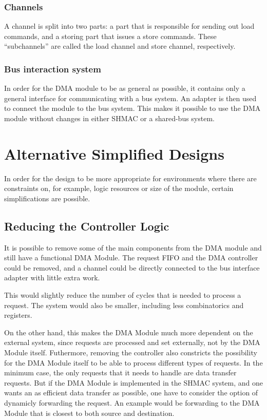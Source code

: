 \subsubsection{Channels}
A channel is split into two parts: a part that is responsible for sending out load
commands, and a storing part that issues a store commands. These ``subchannels''
are called the load channel and store channel, respectively.

\subsubsection{Bus interaction system}
In order for the DMA module to be as general as possible, it contains only a general
interface for communicating with a bus system. An adapter is then used to connect
the module to the bus system. This makes it possible to use the DMA module without
changes in either SHMAC or a shared-bus system.

\section{Alternative Simplified Designs} 

In order for the design to be more appropriate for environments where there are
constraints on, for example, logic resources or size of the module, certain simplifications
are possible.


\subsection{Reducing the Controller Logic}
It is possible to remove some of the main components from the DMA module and still
have a functional DMA Module. The request FIFO and the DMA controller could be removed,
and a channel could be directly connected to the bus interface adapter with little
extra work.

This would slightly reduce the number of cycles that is needed to process a request.
The system would also be smaller, including less combinatorics and registers.

On the other hand, this makes the DMA Module much more dependent on the external system, since requests are processed and set externally, not by the DMA Module itself.
Futhermore, removing the controller also constricts the possibility for the DMA Module itself to be able to process different types of requests.
In the minimum case, the only requests that it needs to handle are data transfer requests.
But if the DMA Module is implemented in the SHMAC system, and one wants an as efficient data transfer as possible, one have to consider the option of dynamicly forwarding the request.
An example would be forwarding to the DMA Module that is  closest to both source and destination.

